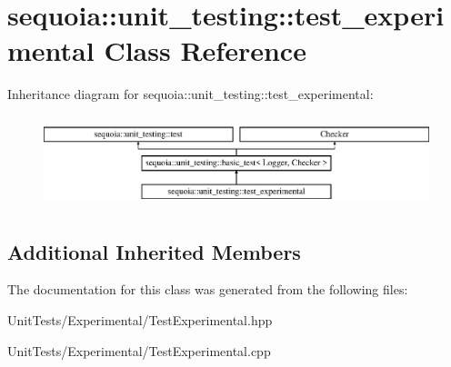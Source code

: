 \hypertarget{classsequoia_1_1unit__testing_1_1test__experimental}{}\section{sequoia\+::unit\+\_\+testing\+::test\+\_\+experimental Class Reference}
\label{classsequoia_1_1unit__testing_1_1test__experimental}
Inheritance diagram for sequoia\+::unit\+\_\+testing\+::test\+\_\+experimental\+:\begin{figure}[H]
\begin{center}
\leavevmode
\includegraphics[height=2.666667cm]{classsequoia_1_1unit__testing_1_1test__experimental}
\end{center}
\end{figure}
\subsection*{Additional Inherited Members}


The documentation for this class was generated from the following files\+:\begin{DoxyCompactItemize}
\item 
Unit\+Tests/\+Experimental/Test\+Experimental.\+hpp\item 
Unit\+Tests/\+Experimental/Test\+Experimental.\+cpp\end{DoxyCompactItemize}
